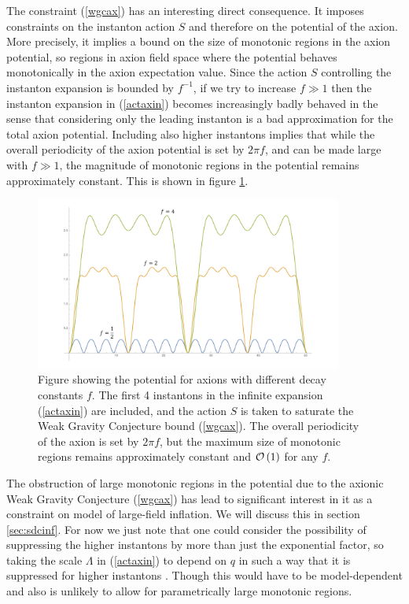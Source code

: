 \documentclass[11pt,a4paper]{article}
\numberwithin{equation}{section}
\numberwithin{table}{section}\setlength{\multlinegap}{25pt}
\begin{document}
The constraint (\ref{wgcax}) has an interesting direct consequence. It imposes constraints on the instanton action $S$ and therefore on the potential of the axion. More precisely, it implies a bound on the size of monotonic regions in the axion potential, so regions in axion field space where the potential behaves monotonically in the axion expectation value. Since the action $S$ controlling the instanton expansion is bounded by $f^{-1}$, if we try to increase $f \gg 1$ then the instanton expansion in (\ref{actaxin}) becomes increasingly badly behaved in the sense that considering only the leading instanton is a bad approximation for the total axion potential. Including also higher instantons implies that while the overall periodicity of the axion potential is set by $2 \pi f$, and can be made large with $f \gg 1$, the magnitude of monotonic regions in the potential remains approximately constant. This is shown in figure \ref{fig:axplot}.
\begin{figure}[t]
\centering
 \includegraphics[width=0.9\textwidth]{axionplot.pdf}
\caption{Figure showing the potential for axions with different decay constants $f$. The first 4 instantons in the infinite expansion (\ref{actaxin}) are included, and the action $S$ is taken to saturate the Weak Gravity Conjecture bound (\ref{wgcax}). The overall periodicity of the axion is set by $2 \pi f$, but the maximum size of monotonic regions remains approximately constant and ${\cal O}\left(1\right)$ for any $f$.}
\label{fig:axplot}
\end{figure}

The obstruction of large monotonic regions in the potential due to the axionic Weak Gravity Conjecture (\ref{wgcax}) has lead to significant interest in it as a constraint on model of large-field inflation. We will discuss this in section \ref{sec:sdcinf}. For now we just note that one could consider the possibility of suppressing the higher instantons by more than just the exponential factor, so taking the scale $\Lambda$ in (\ref{actaxin}) to depend on $q$ in such a way that it is suppressed for higher instantons \cite{delaFuente:2014aca}. Though this would have to be model-dependent and also is unlikely to allow for parametrically large monotonic regions. 
\end{document}
